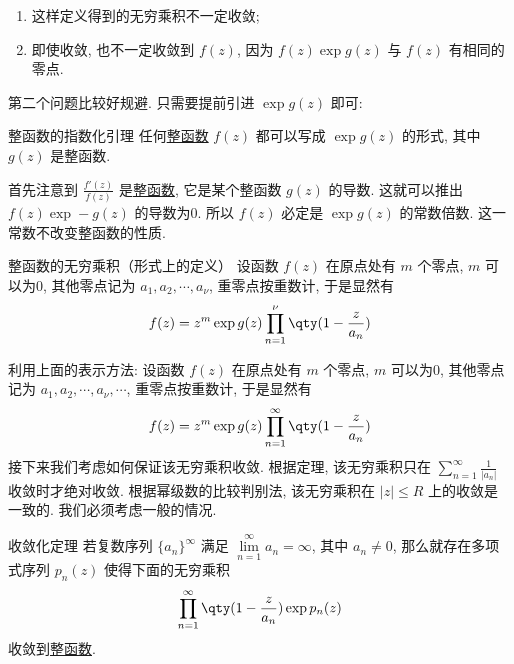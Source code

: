 \documentclass[UTF8]{ctexart}
\begin{document}
        \begin{enumerate}
            \item 这样定义得到的无穷乘积不一定收敛; 
            \item 即使收敛, 也不一定收敛到 \(f(z)\), 因为 \(f(z)\exp g(z)\) 与 \(f(z)\) 有相同的零点. 
        \end{enumerate}

        第二个问题比较好规避. 只需要提前引进 \(\exp g(z)\) 即可: 

        \begin{lma}
            {整函数的指数化引理}
            任何\hyperref[dfn:EntireFunction]{整函数} \(f(z)\) 都可以写成 \(\exp g(z)\) 的形式, 其中 \(g(z)\) 是整函数.
        \end{lma}

        \begin{prf}
            首先注意到 \(\frac{f'(z)}{f(z)}\) 是\hyperref[dfn:EntireFunction]{整函数}, 它是某个整函数 \(g(z)\) 的导数. 这就可以推出 \(f(z)\exp -g(z)\) 的导数为0. 所以 \(f(z)\) 必定是 \(\exp g(z)\) 的常数倍数. 这一常数不改变整函数的性质. 
        \end{prf}

        \begin{dfn}
            {整函数的无穷乘积（形式上的定义）}
            设函数 \(f(z)\) 在原点处有 \(m\) 个零点,  \(m\) 可以为0, 其他零点记为 \(a_1,a_2,\cdots, a_\nu\), 重零点按重数计, 于是显然有
            \[f(z)=z^m\exp g(z)\prod_{n=1}^{\nu}\qty(1-\frac{z}{a_n})\]
        \end{dfn}

        利用上面的表示方法: 设函数 \(f(z)\) 在原点处有 \(m\) 个零点,  \(m\) 可以为0, 其他零点记为 \(a_1,a_2,\cdots, a_\nu, \cdots\), 重零点按重数计, 于是显然有
        \[f(z)=z^m\exp g(z)\prod_{n=1}^{\infty}\qty(1-\frac{z}{a_n})\]
        接下来我们考虑如何保证该无穷乘积收敛. 根据定理, 该无穷乘积只在 \(\sum\limits_{n=1}^{\infty}\frac{1}{|a_n|}\) 收敛时才绝对收敛. 根据幂级数的比较判别法, 该无穷乘积在 \(|z|\leqslant R\) 上的收敛是一致的. 我们必须考虑一般的情况. 

        \begin{thm}
            {收敛化定理}
            若复数序列 \(\{a_n\}^\infty\) 满足 \(\lim\limits_{n=1}^{\infty}a_n=\infty\), 其中 \(a_n\neq 0\), 那么就存在多项式序列 \(p_n(z)\) 使得下面的无穷乘积
            \[\prod_{n=1}^{\infty}\qty(1-\frac{z}{a_n})\exp p_n(z)\]
            收敛到\hyperref[dfn:EntireFunction]{整函数}.
        \end{thm}
\end{document}
